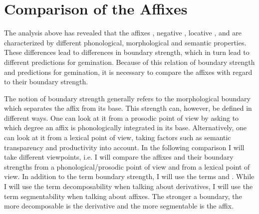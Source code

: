 \section{Comparison of the Affixes}\label{comparison affixes}

The analysis above has revealed that the affixes , negative , locative ,  and  are characterized by different phonological, morphological and semantic properties. These differences lead to differences in boundary strength, which in turn lead to different predictions for gemination.  Because of this relation of boundary strength and predictions for gemination, it is necessary to compare the affixes with regard to their boundary strength. 

The notion of boundary strength generally refers to the morphological boundary which separates the affix from its base. This strength can, however, be defined in different ways. One can look at it from a prosodic point of view by asking to which degree an affix is phonologically integrated in its base. Alternatively, one can look at it from a lexical point of view, taking factors such as semantic transparency and productivity into account. In the following comparison I will take different viewpoints, i.e. I will compare the affixes and their boundary strengths from a phonological/prosodic point of view and  from a lexical point of view. In addition to the term boundary strength, I will use the terms  and . While I will use the term decomposability when talking about derivatives, I will use the term segmentability when talking about affixes. The stronger a boundary, the more decomposable is the derivative and the more segmentable is the affix.








